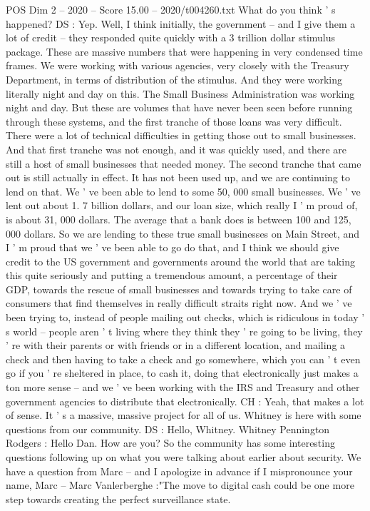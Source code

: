 \begin{textsample}{POS Dim 2 – 2020 – Score 15.00 – 2020/t004260.txt}
What do you think ' s happened?
DS : Yep.
Well, I think initially, the government -- and I give them a lot of credit -- they responded quite quickly with a 3 trillion dollar stimulus package.
These are massive numbers that were happening in very condensed time frames.
We were working with various agencies, very closely with the Treasury Department, in terms of distribution of the stimulus.
And they were working literally night and day on this.
The Small Business Administration was working night and day.
But these are volumes that have never been seen before running through these systems, and the first tranche of those loans was very difficult.
There were a lot of technical difficulties in getting those out to small businesses.
And that first tranche was not enough, and it was quickly used, and there are still a host of small businesses that needed money.
The second tranche that came out is still actually in effect.
It has not been used up, and we are continuing to lend on that.
We ' ve been able to lend to some 50, 000 small businesses.
We ' ve lent out about 1. 7 billion dollars, and our loan size, which really I ' m proud of, is about 31, 000 dollars.
The average that a bank does is between 100 and 125, 000 dollars.
So we are lending to these true small businesses on Main Street, and I ' m proud that we ' ve been able to go do that, and I think we should give credit to the US government and governments around the world that are taking this quite seriously and putting a tremendous amount, a percentage of their GDP, towards the rescue of small businesses and towards trying to take care of consumers that find themselves in really difficult straits right now.
And we ' ve been trying to, instead of people mailing out checks, which is ridiculous in today ' s world -- people aren ' t living where they think they ' re going to be living, they ' re with their parents or with friends or in a different location, and mailing a check and then having to take a check and go somewhere, which you can ' t even go if you ' re sheltered in place, to cash it, doing that electronically just makes a ton more sense -- and we ' ve been working with the IRS and Treasury and other government agencies to distribute that electronically.
CH : Yeah, that makes a lot of sense.
It ' s a massive, massive project for all of us.
Whitney is here with some questions from our community.
DS : Hello, Whitney.
Whitney Pennington Rodgers : Hello Dan.
How are you?
So the community has some interesting questions following up on what you were talking about earlier about security.
We have a question from Marc -- and I apologize in advance if I mispronounce your name, Marc -- Marc Vanlerberghe :"The move to digital cash could be one more step towards creating the perfect surveillance state.

\end{textsample}
